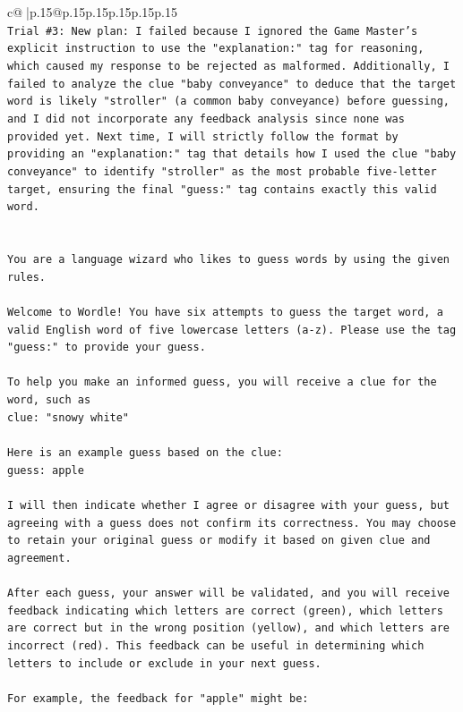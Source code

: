 \documentclass{article}
\begin{document}
{\begin{supertabular}{c@{$\;$}|p{.15\linewidth}@{}p{.15\linewidth}p{.15\linewidth}p{.15\linewidth}p{.15\linewidth}p{.15\linewidth}}
{{{\\ 
\texttt{Trial \#3: New plan: I failed because I ignored the Game Master's explicit instruction to use the "explanation:" tag for reasoning, which caused my response to be rejected as malformed. Additionally, I failed to analyze the clue "baby conveyance" to deduce that the target word is likely "stroller" (a common baby conveyance) before guessing, and I did not incorporate any feedback analysis since none was provided yet. Next time, I will strictly follow the format by providing an "explanation:" tag that details how I used the clue "baby conveyance" to identify "stroller" as the most probable five{-}letter target, ensuring the final "guess:" tag contains exactly this valid word.} \\
\\ 
\\ 
\texttt{You are a language wizard who likes to guess words by using the given rules.} \\
\\ 
\texttt{Welcome to Wordle! You have six attempts to guess the target word, a valid English word of five lowercase letters (a{-}z). Please use the tag "guess:" to provide your guess.} \\
\\ 
\texttt{To help you make an informed guess, you will receive a clue for the word, such as} \\
\texttt{clue: "snowy white"} \\
\\ 
\texttt{Here is an example guess based on the clue: } \\
\texttt{guess: apple} \\
\\ 
\texttt{I will then indicate whether I agree or disagree with your guess, but agreeing with a guess does not confirm its correctness. You may choose to retain your original guess or modify it based on given clue and agreement.} \\
\\ 
\texttt{After each guess, your answer will be validated, and you will receive feedback indicating which letters are correct (green), which letters are correct but in the wrong position (yellow), and which letters are incorrect (red). This feedback can be useful in determining which letters to include or exclude in your next guess.} \\
\\ 
\texttt{For example, the feedback for "apple" might be:} \\
}}}
\end{supertabular}}
\end{document}
